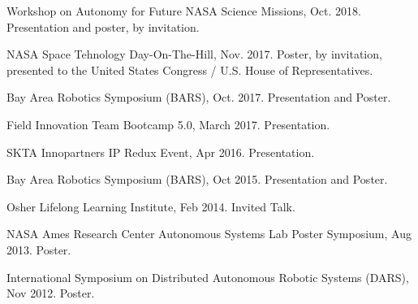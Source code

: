 \documentclass[letterpaper]{deedy-resume} %
\begin{document}
{\begin{etaremune}
  

\item {\Large{\textasteriskcentered}} {} Workshop on Autonomy for Future NASA Science Missions, Oct. 2018. Presentation and poster, by invitation.
  
\item {\Large{\textasteriskcentered}} {} NASA Space Tehnology Day-On-The-Hill, Nov. 2017. Poster, by invitation, presented to the United States Congress / U.S. House of Representatives.

\item {} Bay Area Robotics Symposium (BARS), Oct. 2017. Presentation and Poster.

\item {} Field Innovation Team Bootcamp 5.0, March 2017. Presentation.

\item {} SKTA Innopartners IP Redux Event, Apr 2016. Presentation.

\item {} Bay Area Robotics Symposium (BARS), Oct 2015. Presentation and Poster.
  
\item {\Large{\textasteriskcentered}} {} Osher Lifelong Learning Institute, Feb 2014. Invited Talk.

\item {} NASA Ames Research Center Autonomous Systems Lab Poster Symposium, Aug 2013. Poster.

\item {} International Symposium on Distributed Autonomous Robotic Systems (DARS), Nov 2012. Poster.

\end{etaremune}

}
\end{document}
